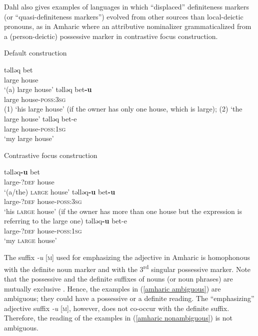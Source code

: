 {
Dahl also gives examples of languages in which “displaced” definiteness markers (or “quasi-definiteness markers”) evolved from other sources than local\hyp{}deictic pronouns, as in Amharic where an attributive nominalizer grammaticalized from a (person-deictic) possessive marker in contrastive focus construction.
\begin{exe}
\ex	{}
\begin{xlist}
\ex	\rm{Default construction}
\begin{xlist}
\ex
\gll	təlləq bet\\
	large	house\\								
\glt	‘(a) large house’
\ex	\label{amharic ambiguous}
\gll	təlləq bet\textbf{-u}\\
	large house-\textsc{poss:3sg}\\
\glt	(1) ‘his large house’ (if the owner has only one house, which is large); (2) ‘the large house’
\ex
\gll	təlləq bet-e\\
	large house-\textsc{poss:1sg}\\
\glt	‘my large house’
\end{xlist}
\ex	\rm{Contrastive focus construction}
\begin{xlist}
\ex	
\gll	təlləq\textbf{-u} bet\\
	large-\textsc{?def} house\\
\glt	‘(a/the) \textsc{large} house’
\ex	\label{amharic nonambiguous}
\gll	təlləq\textbf{-u} bet\textbf{-u}\\
	large-\textsc{?def} house-\textsc{poss:3sg}\\
\glt	‘his \textsc{large} house’ (if the owner has more than one house but the expression is referring to the large one)
\ex
\gll	təlləq\textbf{-u} bet-e\\
	large-\textsc{?def} house-\textsc{poss:1sg}\\
\glt	‘my \textsc{large} house’
\end{xlist}
\end{xlist}
\end{exe}
The suffix \textit{-u} [\textsc{m}] used for emphasizing the adjective in Amharic is homophonous with the definite noun marker and with the 3\textsuperscript{rd} singular possessive marker. Note that the possessive and the definite suffixes of nouns (or noun phrases) are mutually exclusive \citep[463]{hudson1997}. Hence, the examples in (\ref{amharic ambiguous}) are ambiguous; they could have a possessive or a definite reading. The “emphasizing” adjective suffix \textit{-u} [\textsc{m}], however, does not co-occur with the definite suffix. Therefore, the reading of the examples in (\ref{amharic nonambiguous}) is not ambiguous.

}

